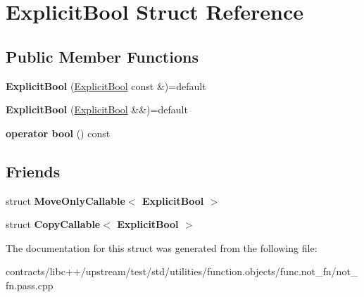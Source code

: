 \hypertarget{struct_explicit_bool}{}\section{Explicit\+Bool Struct Reference}
\label{struct_explicit_bool}
\subsection*{Public Member Functions}
\begin{DoxyCompactItemize}
\item 
\mbox{\label{struct_explicit_bool_ac76277cb9ebb9d39074a82283edaf2e8}} 
{\bfseries Explicit\+Bool} (\mbox{\hyperlink{struct_explicit_bool}{Explicit\+Bool}} const \&)=default
\item 
\mbox{\label{struct_explicit_bool_aad274d3c70cdb7f310a2a9cdc076e0af}} 
{\bfseries Explicit\+Bool} (\mbox{\hyperlink{struct_explicit_bool}{Explicit\+Bool}} \&\&)=default
\item 
\mbox{\label{struct_explicit_bool_a2502f91151fdbcefcab9f1abbccea582}} 
{\bfseries operator bool} () const
\end{DoxyCompactItemize}
\subsection*{Friends}
\begin{DoxyCompactItemize}
\item 
\mbox{\label{struct_explicit_bool_a3392154dbbaea7a94931628223b69eaa}} 
struct {\bfseries Move\+Only\+Callable$<$ Explicit\+Bool $>$}
\item 
\mbox{\label{struct_explicit_bool_a5b9e559cad80c4389bfefd725cfb2d96}} 
struct {\bfseries Copy\+Callable$<$ Explicit\+Bool $>$}
\end{DoxyCompactItemize}


The documentation for this struct was generated from the following file\+:\begin{DoxyCompactItemize}
\item 
contracts/libc++/upstream/test/std/utilities/function.\+objects/func.\+not\+\_\+fn/not\+\_\+fn.\+pass.\+cpp\end{DoxyCompactItemize}

